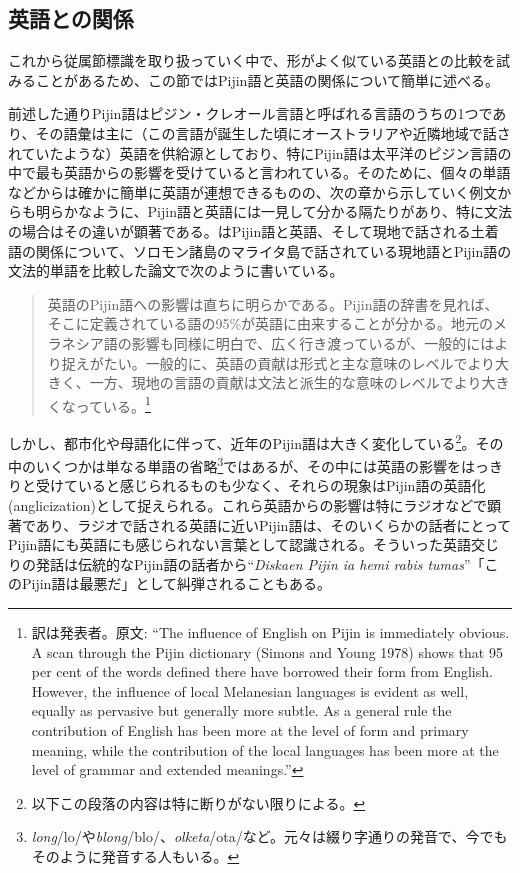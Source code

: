 \subsection{英語との関係}
これから従属節標識を取り扱っていく中で、形がよく似ている英語との比較を試みることがあるため、この節ではPijin語と英語の関係について簡単に述べる。

前述した通りPijin語はピジン・クレオール言語と呼ばれる言語のうちの1つであり、その語彙は主に（この言語が誕生した頃にオーストラリアや近隣地域で話されていたような）英語を供給源としており、特にPijin語は太平洋のピジン言語の中で最も英語からの影響を受けていると言われている\citep{nativization}。そのために、個々の単語などからは確かに簡単に英語が連想できるものの、次の章から示していく例文からも明らかなように、Pijin語と英語には一見して分かる隔たりがあり、特に文法の場合はその違いが顕著である。\cite{malaitan}はPijin語と英語、そして現地で話される土着語の関係について、ソロモン諸島のマライタ島で話されている現地語とPijin語の文法的単語を比較した論文で次のように書いている。

\begin{quotation}
  英語のPijin語への影響は直ちに明らかである。Pijin語の辞書\citep{yumi}を見れば、そこに定義されている語の95\%が英語に由来することが分かる。地元のメラネシア語の影響も同様に明白で、広く行き渡っているが、一般的にはより捉えがたい。一般的に、英語の貢献は形式と主な意味のレベルでより大きく、一方、現地の言語の貢献は文法と派生的な意味のレベルでより大きくなっている。\citep{malaitan}\footnote{訳は発表者。原文: ``The influence of English on Pijin is immediately obvious. A scan through the Pijin dictionary (Simons and Young 1978) shows that 95 per cent of the words defined there have borrowed their form from English. However, the influence of local Melanesian languages is evident as well, equally as pervasive but generally more subtle. As a general rule the contribution of English has been more at the level of form and primary meaning, while the contribution of the local languages has been more at the level of grammar and extended meanings.''}
\end{quotation}

しかし、都市化や母語化に伴って、近年のPijin語は大きく変化している\footnote{以下この段落の内容は特に断りがない限り\cite{nativization}による。}。その中のいくつかは単なる単語の省略\footnote{\textit{long}/lo/や\textit{blong}/blo/、\textit{olketa}/ota/など。元々は綴り字通りの発音で、今でもそのように発音する人もいる。}ではあるが、その中には英語の影響をはっきりと受けていると感じられるものも少なく、それらの現象はPijin語の英語化(anglicization)として捉えられる。これら英語からの影響は特にラジオなどで顕著であり、ラジオで話される英語に近いPijin語は、そのいくらかの話者にとってPijin語にも英語にも感じられない言葉として認識される。そういった英語交じりの発話は伝統的なPijin語の話者から``\textit{Diskaen Pijin ia hemi rabis tumas}''「このPijin語は最悪だ」として糾弾されることもある。

